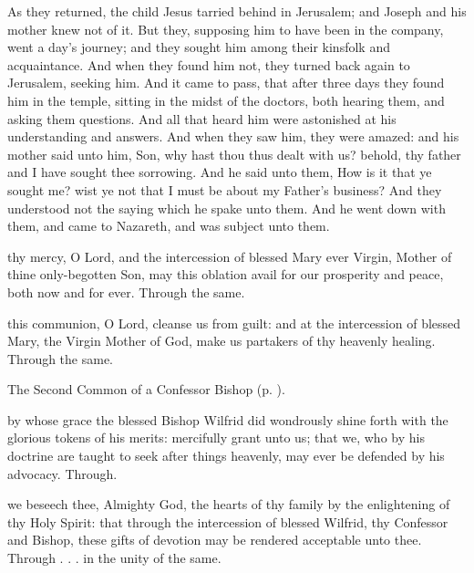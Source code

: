  As they returned, the child Jesus tarried behind in Jerusalem; and Joseph and his mother knew not of it. But they, supposing him to have been in the company, went a day's journey; and they sought him among their kinsfolk and acquaintance. And when they found him not, they turned back again to Jerusalem, seeking him. And it came to pass, that after three days they found him in the temple, sitting in the midst of the doctors, both hearing them, and asking them questions. And all that heard him were astonished at his understanding and answers. And when they saw him, they were amazed: and his mother said unto him, Son, why hast thou thus dealt with us? behold, thy father and I have sought thee sorrowing. And he said unto them, How is it that ye sought me? wist ye not that I must be about my Father's business? And they understood not the saying which he spake unto them. And he went down with them, and came to Nazareth, and was subject unto them.


\secret
{} thy mercy, O Lord, and the intercession of blessed Mary ever Virgin, Mother of thine only-begotten Son, may this oblation avail for our prosperity and peace, both now and for ever. Through the same.

\postcommunion
{} this communion, O Lord, cleanse us from guilt: and at the intercession of blessed Mary, the Virgin Mother of God, make us partakers of thy heavenly healing. Through the same.



\begin{rubric}
	The Second Common of a Confessor Bishop (p. \pageref{CommonConfessorBishopII}).
\end{rubric}

\collect
{} by whose grace the blessed Bishop Wilfrid did wondrously shine forth with the glorious tokens of his merits: mercifully grant unto us; that we, who by his doctrine are taught to seek after things heavenly, may ever be defended by his advocacy. Through.

\secret
{} we beseech thee, Almighty God, the hearts of thy family by the enlightening of thy Holy Spirit: that through the intercession of blessed Wilfrid, thy Confessor and Bishop, these gifts of devotion may be rendered acceptable unto thee. Through . . . in the unity of the same.

